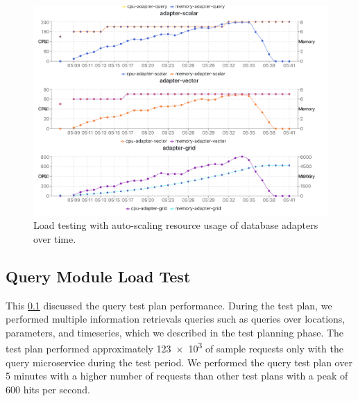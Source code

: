 \begin{figure}[htp]
    \centering
    \includegraphics[width=1.0\textwidth]{results/obs/all_auto/obs_all_auto_15m_adapter_dbs_res.png}
    \caption{Load testing with auto-scaling resource usage of database adapters over time.}
    \label{fi:obs_all_auto_15m_adapter_dbs_res}
\end{figure}


\subsection{Query Module Load Test}
\label{subse:obs_test_plan_query_15min}

This \cref{subse:obs_test_plan_query_15min} discussed the query test plan performance. During the test plan, we performed multiple information retrievals queries such as queries over locations, parameters, and timeseries, which we described in the test planning phase. The test plan performed approximately \num{123e3} of sample requests only with the query microservice during the test period. We performed the query test plan over 5 minutes with a higher number of requests than other test plans with a peak of 600 hits per second.

